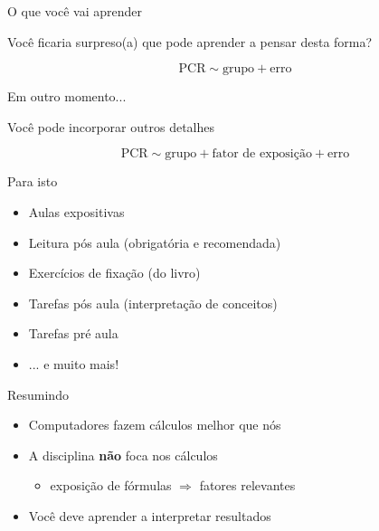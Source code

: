 \documentclass{beamer}
\begin{document}
\begin{frame}{O que você vai aprender}
  \begin{block}{}
    Você ficaria surpreso(a) que pode aprender a pensar desta forma?
  \end{block}

  $$\text{PCR} \sim \text{grupo} + \text{erro}$$
\end{frame}

\begin{frame}{Em outro momento...}
  \begin{block}{}
    Você pode incorporar outros detalhes
  \end{block}

  $$\text{PCR} \sim \text{grupo} + \text{fator de exposição} + \text{erro}$$
\end{frame}

\begin{frame}{Para isto}
  \begin{itemize}
  \item Aulas expositivas
  \item Leitura pós aula (obrigatória e recomendada)
  \item Exercícios de fixação (do livro)
  \item Tarefas pós aula (interpretação de conceitos)
  \item Tarefas pré aula
  \item ... e muito mais!
  \end{itemize}
\end{frame}

\begin{frame}{Resumindo}
  \begin{itemize}
  \item Computadores fazem cálculos melhor que nós
  \item A disciplina {\bf não} foca nos cálculos
    \begin{itemize}
    \item exposição de fórmulas $\Rightarrow$ fatores relevantes
    \end{itemize}
  \item Você deve aprender a interpretar resultados
  \end{itemize}
\end{frame}

\end{document}
